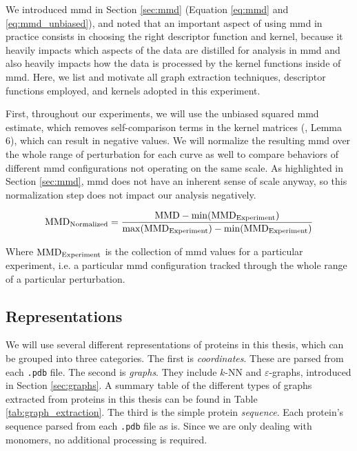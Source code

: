 We introduced \gls{mmd} in Section \ref{sec:mmd} (Equation \ref{eq:mmd} and
\ref{eq:mmd_unbiased}), and noted that an important aspect of using
\gls{mmd} in practice consists in choosing the right descriptor function
and kernel, because it heavily impacts which aspects of the data are distilled
for analysis in \gls{mmd} and also heavily impacts how the data is processed by the
kernel functions inside of \gls{mmd}. Here, we list and motivate all graph extraction
techniques, descriptor functions employed, and kernels adopted in this
experiment.

First, throughout our experiments, we will use the unbiased squared
\gls{mmd} estimate, which removes self-comparison terms in the kernel
matrices (\cite{gretton2012kernel}, Lemma 6), which can result in negative
values. We will normalize the resulting \gls{mmd} over the whole range of
perturbation for each curve as well to compare behaviors of different
\gls{mmd} configurations not operating on the same scale. As highlighted in
Section \ref{sec:mmd}, \gls{mmd} does not have an inherent sense of scale
anyway, so this normalization step does not impact our analysis negatively.


\begin{equation}
  \label{eq:normalization}
  \text{MMD}_{\textnormal{Normalized}} = {\text{MMD} - \min(\text{MMD}_{\textnormal{Experiment}}) \over \max(\text{MMD}_{\textnormal{Experiment}}) - \min(\text{MMD}_{\textnormal{Experiment}})}
\end{equation}

Where $\text{MMD}_{\textnormal{Experiment}}$ is the collection of \gls{mmd} values for a particular
experiment, i.e. a particular \gls{mmd} configuration tracked through the whole range
of a particular perturbation.

\subsection{Representations}
We will use several different representations of proteins in this thesis, which can be
grouped into three categories. The first is \emph{coordinates}. These are parsed
from each \texttt{.pdb} file. The second is \emph{graphs}. They include $k$-NN
and $\varepsilon$-graphs, introduced in Section \ref{sec:graphs}. A summary
table of the different types of graphs extracted from proteins in this thesis
can be found in Table \ref{tab:graph_extraction}. The third is the simple
protein \emph{sequence}. Each protein's sequence parsed from each \texttt{.pdb}
file as is. Since we are only dealing with monomers, no additional processing is
required.

